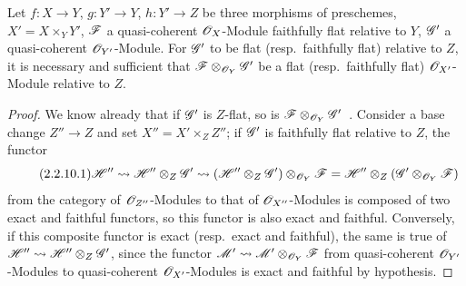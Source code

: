 \begin{proposition}[2.2.10]
\label{IV.2.2.10}
Let $f:X\to Y$, $g:Y'\to Y$, $h:Y'\to Z$ be three morphisms of preschemes, $X'=X\times_Y Y'$, $\mathscr{F}$ a quasi-coherent $\mathscr{O}_X$-Module faithfully flat relative to $Y$, $\mathscr{G}'$ a quasi-coherent $\mathscr{O}_{Y'}$-Module.
For $\mathscr{G}'$ to be flat \textnormal{(resp.}\ faithfully flat\textnormal{)} relative to $Z$, it is necessary and sufficient that $\mathscr{F}\otimes_{\mathscr{O}_Y}\mathscr{G}'$ be a flat \textnormal{(resp.}\ faithfully flat\textnormal{)} $\mathscr{O}_{X'}$-Module relative to $Z$.
\end{proposition}

\begin{proof}
We know already that if $\mathscr{G}'$ is $Z$-flat, so is $\mathscr{F}\otimes_{\mathscr{O}_Y}\mathscr{G}'$~.
Consider a base change $Z''\to Z$ and set $X''=X'\times_Z Z''$; if $\mathscr{G}'$ is faithfully flat relative to $Z$, the functor
\begin{equation}
\tag{2.2.10.1}
\label{IV.2.2.10.1}
\mathscr{H}''\leadsto\mathscr{H}''\otimes_Z\mathscr{G}'\leadsto(\mathscr{H}''\otimes_Z\mathscr{G}')\otimes_{\mathscr{O}_Y}\mathscr{F}=\mathscr{H}''\otimes_Z(\mathscr{G}'\otimes_{\mathscr{O}_Y}\mathscr{F})
\end{equation}
from the category of $\mathscr{O}_{Z''}$-Modules to that of $\mathscr{O}_{X''}$-Modules is composed of two exact and faithful functors, so this functor is also exact and faithful.
Conversely, if this composite functor is exact \textnormal{(}resp.\ exact and faithful\textnormal{)}, the same is true of $\mathscr{H}''\leadsto\mathscr{H}''\otimes_Z\mathscr{G}'$, since the functor $\mathscr{M}'\leadsto\mathscr{M}'\otimes_{\mathscr{O}_Y}\mathscr{F}$ from quasi-coherent $\mathscr{O}_{Y'}$-Modules to quasi-coherent $\mathscr{O}_{X'}$-Modules is exact and faithful by hypothesis.
\end{proof}

